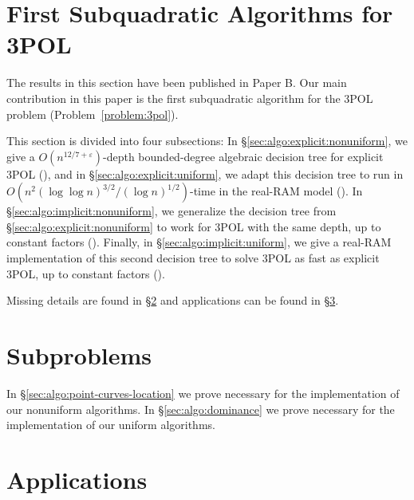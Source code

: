 \section{First Subquadratic Algorithms for 3POL}

The results in this section have been published in Paper B.
Our main contribution in this paper is the first subquadratic algorithm for
the 3POL problem (Problem~\ref{problem:3pol}).

This section is divided into four subsections:
%
In \S\ref{sec:algo:explicit:nonuniform},
we give a $O(n^{12/7+\varepsilon})$-depth bounded-degree
algebraic decision tree for explicit 3POL (), and in
\S\ref{sec:algo:explicit:uniform}, we adapt this decision tree
to run in $O(n^2 {(\log \log n)}^{3/2} / {(\log n)}^{1/2})$-time
in the real-RAM model ().
%
In \S\ref{sec:algo:implicit:nonuniform}, we generalize the decision tree from
\S\ref{sec:algo:explicit:nonuniform} to work for 3POL with the same depth, up
to constant factors ().
%
Finally, in \S\ref{sec:algo:implicit:uniform}, we give a real-RAM
implementation of this second decision tree to solve 3POL as fast as
explicit 3POL, up to constant factors ().

Missing details are found in
\S\ref{paper:3pol-algorithm:subproblems}
and applications can be found in \S\ref{sec:applications}.






\section{Subproblems}\label{paper:3pol-algorithm:subproblems}

In \S\ref{sec:algo:point-curves-location} we prove  necessary for the
implementation of our nonuniform algorithms.
%
In \S\ref{sec:algo:dominance} we prove  necessary for the
implementation of our uniform algorithms.




\section{Applications}\label{sec:applications}




